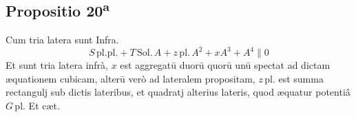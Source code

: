 \documentclass[11pt,a4paper]{article}
\begin{document}
\subsection*{Propositio 20\textsuperscript{a}}

Cum tria latera sunt Infra.
\[ S\,\mathrm{pl.pl.} + T\,\mathrm{Sol.}\,A + z\,\mathrm{pl.}\,A^{2} + xA^{3} + A^{4} \parallel 0 \]
Et sunt tria latera infrà, $x$ est aggregatū duorū quorū unū spectat ad dictam æquationem cubicam, alterū verò ad lateralem propositam, $z\,\mathrm{pl.}$ est summa rectangulj sub dictis lateribus, et quadratj alterius lateris, quod æquatur potentiâ $G\,\mathrm{pl.}$ Et cæt.
\end{document}
